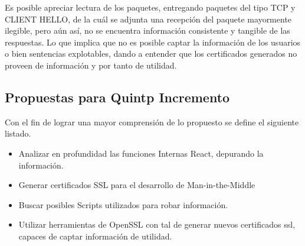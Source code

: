 \documentclass[a4paper,11pt]{article}
\theoremstyle{mytheor}
\begin{document}
\begin{itemize}
    Es posible apreciar lectura de los paquetes, entregando paquetes del tipo TCP y CLIENT HELLO, de la cuál se adjunta una recepción del paquete mayormente ilegible, pero aún así, no se encuentra información consistente y tangible de las respuestas. Lo que implica que no es posible captar la información de los usuarios o bien sentencias explotables, dando a entender que los certificados generados no proveen de información y por tanto de utilidad.
 
    
    
\end{itemize}


\subsection{Propuestas para Quintp Incremento}

Con el fin de lograr una mayor comprensión de lo propuesto se define el siguiente listado.

\begin{itemize}
    \item Analizar en profundidad las funciones Internas React, depurando la información.
    \item Generar certificados SSL para el desarrollo de Man-in-the-Middle 
    \item Buscar posibles Scripts utilizados para robar información.
    \item Utilizar herramientas de OpenSSL con tal de generar nuevos certificados ssl, capaces de captar información de utilidad.
\end{itemize}



\newpage
\end{document}

